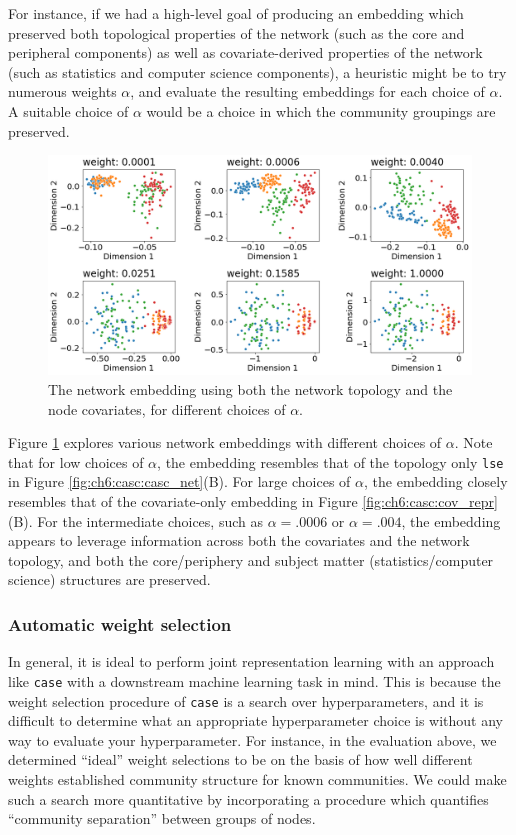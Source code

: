 For instance, if we had a high-level goal of producing an embedding which preserved both topological properties of the network (such as the core and peripheral components) as well as covariate-derived properties of the network (such as statistics and computer science components), a heuristic might be to try numerous weights $\alpha$, and evaluate the resulting embeddings for each choice of $\alpha$. A suitable choice of $\alpha$ would be a choice in which the community groupings are preserved.

\begin{figure}[h]
    \centering
    \includegraphics[width=\linewidth]{representations/ch6/Images/case_outputs.png}
    \caption[CASE embedding example]{The network embedding using both the network topology and the node covariates, for different choices of $\alpha$.}
    \label{fig:ch6:casc:casc_out}
\end{figure}
Figure \ref{fig:ch6:casc:casc_out} explores various network embeddings with different choices of $\alpha$. Note that for low choices of $\alpha$, the embedding resembles that of the topology only \texttt{lse} in Figure \ref{fig:ch6:casc:casc_net}(B). For large choices of $\alpha$, the embedding closely resembles that of the covariate-only embedding in Figure \ref{fig:ch6:casc:cov_repr}(B). For the intermediate choices, such as $\alpha = .0006$ or $\alpha = .004$, the embedding appears to leverage information across both the covariates and the network topology, and both the core/periphery and subject matter (statistics/computer science) structures are preserved.

\subsubsection{Automatic weight selection}

In general, it is ideal to perform joint representation learning with an approach like \texttt{case} with a downstream machine learning task in mind. This is because the weight selection procedure of \texttt{case} is a search over hyperparameters, and it is difficult to determine what an appropriate hyperparameter choice is without any way to evaluate your hyperparameter. For instance, in the evaluation above, we determined ``ideal'' weight selections to be on the basis of how well different weights established community structure for known communities. We could make such a search more quantitative by incorporating a procedure which quantifies ``community separation'' between groups of nodes.

